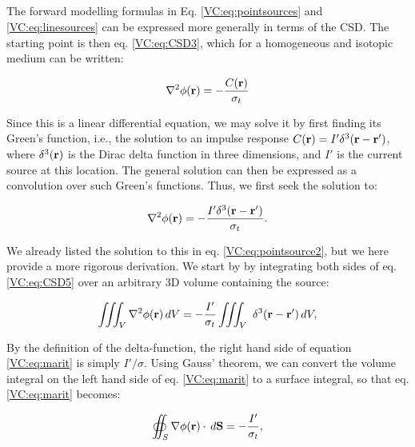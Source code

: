 \subsection{}
\label{sec:VC:CSD}
The forward modelling formulas in Eq. \ref{VC:eq:pointsources} and \ref{VC:eq:linesources} can be expressed more generally in terms of the CSD. The starting point is then eq. \ref{VC:eq:CSD3}, which for a homogeneous and isotopic medium can be written: 

\begin{equation}
\nabla^2 \phi({\bf r}) = - \frac{C({\bf r})}{\sigma_t}
\label{VC:eq:CSD4}
\end{equation}

Since this is a linear differential equation, we may solve it by first finding its Green's function, i.e., the solution to an impulse response $C({\bf r}) = I' \delta^3({\bf r-r'})$, where $\delta^3({\bf r})$ is the Dirac delta function in three dimensions, and $I'$ is the current source at this location. The general solution can then be expressed as a convolution over such Green's functions. Thus, we first seek the solution to: 

\begin{equation}
\nabla^2 \phi({\bf r}) = - \frac{I' \delta^3({\bf r-r'})}{\sigma_t}.
\label{VC:eq:CSD5}
\end{equation}

We already listed the solution to this in eq. \ref{VC:eq:pointsource2}, but we here provide a more rigorous derivation. We start by by integrating both sides of eq. \ref{VC:eq:CSD5} over an arbitrary 3D volume containing the source:

\begin{equation}
\iiint_V \nabla^2\phi({\bf r}) \,dV =  - \frac{I'}{\sigma_t} \iiint_V \ \delta^3({\bf r-r'}) \, dV,
\label{VC:eq:marit}
\end{equation}

By the definition of the delta-function, the right hand side of equation \ref{VC:eq:marit} is simply $I'/\sigma$. Using Gauss' theorem, we can convert the volume integral on the left hand side of eq. \ref{VC:eq:marit} to a surface integral, so that eq. \ref{VC:eq:marit} becomes:

\begin{equation}
\oiint_{S} \nabla\phi({\bf r}) \cdot \, d{\bf S}  = - \frac{I'}{\sigma_t},
\label{VC:eq:berit1}
\end{equation}


